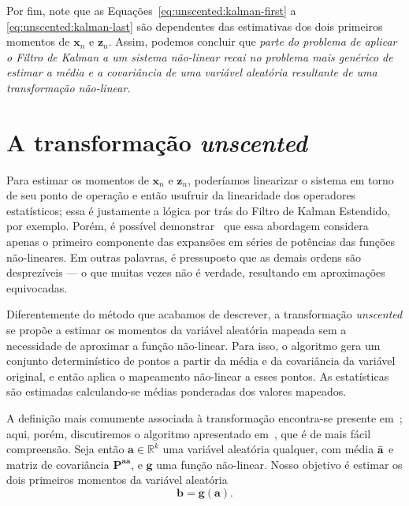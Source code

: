 Por fim, note que as Equações~\eqref{eq:unscented:kalman-first} a \eqref{eq:unscented:kalman-last} são dependentes das estimativas dos dois primeiros momentos de $\mathbf{x}_n$ e $\mathbf{z}_n$. Assim, podemos concluir que \emph{parte do problema de aplicar o Filtro de Kalman a um sistema não-linear recai no problema mais genérico de estimar a média e a covariância de uma variável aleatória resultante de uma transformação não-linear.}


\section{A transformação \textit{unscented}}

Para estimar os momentos de $\mathbf{x}_{n}$ e $\mathbf{z}_n$, poderíamos linearizar o sistema em torno de seu ponto de operação e então usufruir da linearidade dos operadores estatísticos; essa é justamente a lógica por trás do Filtro de Kalman Estendido, por exemplo. Porém, é possível demonstrar~\cite{julier-1997} que essa abordagem considera apenas o primeiro componente das expansões em séries de potências das funções não-lineares. Em outras palavras, é pressuposto que as demais ordens são desprezíveis --- o que muitas vezes não é verdade, resultando em aproximações equivocadas.

Diferentemente do método que acabamos de descrever, a transformação \textit{unscented} se propõe a estimar os momentos da variável aleatória mapeada sem a necessidade de aproximar a função não-linear. Para isso, o algoritmo gera um conjunto determinístico de pontos a partir da média e da covariância da variável original, e então aplica o mapeamento não-linear a esses pontos. As estatísticas são estimadas calculando-se médias ponderadas dos valores mapeados.

A definição mais comumente associada à transformação encontra-se presente em~\cite{julier-2002}; aqui, porém, discutiremos o algoritmo apresentado em~\cite{julier-1997}, que é de mais fácil compreensão. Seja então $\mathbf{a} \in \mathbb{R}^k$ uma variável aleatória qualquer, com média $\Bar{\mathbf{a}}$ e matriz de covariância $\mathbf{P}^{\mathbf{a}\mathbf{a}}$, e $\mathbf{g}$ uma função não-linear. Nosso objetivo é estimar os dois primeiros momentos da variável aleatória
\begin{equation}
    \mathbf{b} = \mathbf{g}(\mathbf{a}).
\end{equation}

